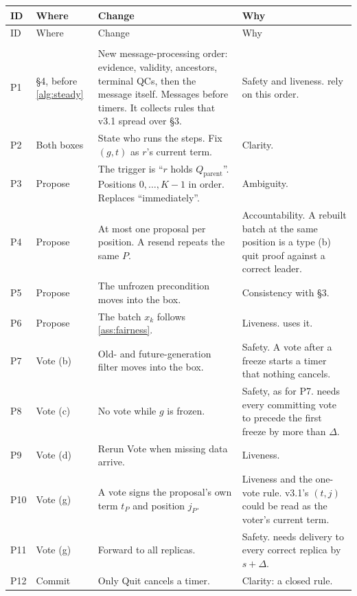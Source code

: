 \documentclass[11pt,a4paper]{article}
\begin{document}
{\small
\begin{xltabular}{\linewidth}{@{}>{\raggedright\arraybackslash}p{.05\linewidth}
 >{\raggedright\arraybackslash}p{.15\linewidth} Y
 >{\raggedright\arraybackslash}p{.27\linewidth}@{}}
\toprule
ID & Where & Change & Why\\
\midrule
\endfirsthead
\toprule
ID & Where & Change & Why\\
\midrule
\endhead
\bottomrule
\endfoot
{}\\
P1 & \S4, before \cref{alg:steady} & New message-processing order:
evidence, validity, ancestors, terminal QCs, then the message itself.
Messages before timers. It collects rules that v3.1 spread over \S3. &
Safety and liveness.  rely on this order.\\
P2 & Both boxes & State who runs the steps. Fix $(g,t)$ as $r$'s current
term. & Clarity.\\
P3 & Propose & The trigger is ``$r$ holds $Q_{\mathrm{parent}}$''.
Positions $0,\ldots,K-1$ in order. Replaces ``immediately''. & Ambiguity.\\
P4 & Propose & At most one proposal per position. A resend repeats the
same $P$. & Accountability. A rebuilt batch at the same position is a type
(b) quit proof against a correct leader.\\
P5 & Propose & The unfrozen precondition moves into the box. &
Consistency with \S3.\\
P6 & Propose & The batch $x_k$ follows \cref{ass:fairness}. & Liveness.
 uses it.\\
P7 & Vote (b) & Old- and future-generation filter moves into the box. &
Safety. A vote after a freeze starts a timer that nothing cancels.\\
P8 & Vote (c) & No vote while $g$ is frozen. & Safety, as for P7.
 needs every committing vote to precede the first freeze
by more than $\Delta$.\\
P9 & Vote (d) & Rerun Vote when missing data arrive. & Liveness.\\
P10 & Vote (g) & A vote signs the proposal's own term $t_P$ and position
$j_P$. & Liveness and the one-vote rule. v3.1's $(t,j)$ could be read as
the voter's current term.\\
P11 & Vote (g) & Forward to all replicas. & Safety. 
needs delivery to every correct replica by $s+\Delta$.\\
P12 & Commit & Only Quit cancels a timer. & Clarity: a closed rule.\\

\end{xltabular}}
\end{document}
